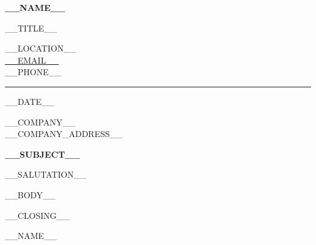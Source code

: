 \documentclass[11pt,a4paper]{article}
\begin{document}
\begin{minipage}{\textwidth}
{\fontsize{25}{27}\selectfont\bfseries\color{mainblue} __NAME__}\par
\vspace{0.08cm}
{\large\color{black!68} __TITLE__}\par
\vspace{0.65cm}
__LOCATION__\\
\href{mailto:__EMAIL__}{\color{mainblue}__EMAIL__}\\
__PHONE__

\vspace{0.75cm}
\textcolor{black!28}{\rule{\textwidth}{0.6pt}}

\vspace{0.25cm}
\hfill __DATE__

\vspace{0.25cm}
__COMPANY__\\
__COMPANY_ADDRESS__

\vspace{0.65cm}
{\large\bfseries\color{mainblue} __SUBJECT__}

\vspace{0.30cm}
__SALUTATION__

\begin{justify}
__BODY__
\end{justify}

\vspace{0.30cm}
__CLOSING__

\vspace{0.65cm}
__NAME__
\end{minipage}
\end{document}
